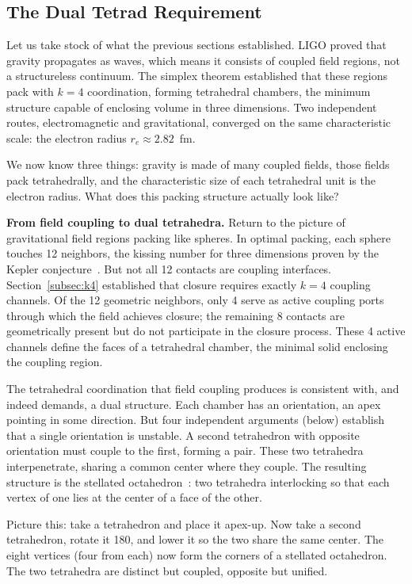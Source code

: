 \documentclass[aps,prd,preprint,superscriptaddress,showpacs,preprintnumbers,amsmath,amssymb,nofootinbib]{revtex4-2}
\begin{document}
\subsection{The Dual Tetrad Requirement}
\label{subsec:dual}

Let us take stock of what the previous sections established. LIGO proved that gravity propagates as waves, which means it consists of coupled field regions, not a structureless continuum. The simplex theorem established that these regions pack with $k = 4$ coordination, forming tetrahedral chambers, the minimum structure capable of enclosing volume in three dimensions. Two independent routes, electromagnetic and gravitational, converged on the same characteristic scale: the electron radius $r_e \approx 2.82$~fm.

We now know three things: gravity is made of many coupled fields, those fields pack tetrahedrally, and the characteristic size of each tetrahedral unit is the electron radius. What does this packing structure actually look like?

\textbf{From field coupling to dual tetrahedra.} Return to the picture of gravitational field regions packing like spheres. In optimal packing, each sphere touches 12 neighbors, the kissing number for three dimensions proven by the Kepler conjecture~\cite{hales2005}. But not all 12 contacts are coupling interfaces. Section~\ref{subsec:k4} established that closure requires exactly $k = 4$ coupling channels. Of the 12 geometric neighbors, only 4 serve as active coupling ports through which the field achieves closure; the remaining 8 contacts are geometrically present but do not participate in the closure process. These 4 active channels define the faces of a tetrahedral chamber, the minimal solid enclosing the coupling region.

The tetrahedral coordination that field coupling produces is consistent with, and indeed demands, a dual structure. Each chamber has an orientation, an apex pointing in some direction. But four independent arguments (below) establish that a single orientation is unstable. A second tetrahedron with opposite orientation must couple to the first, forming a pair. These two tetrahedra interpenetrate, sharing a common center where they couple. The resulting structure is the stellated octahedron~\cite{coxeter1973}: two tetrahedra interlocking so that each vertex of one lies at the center of a face of the other.

Picture this: take a tetrahedron and place it apex-up. Now take a second tetrahedron, rotate it 180\textdegree, and lower it so the two share the same center. The eight vertices (four from each) now form the corners of a stellated octahedron. The two tetrahedra are distinct but coupled, opposite but unified.
\end{document}
